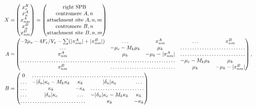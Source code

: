 \documentclass[a4paper,12pt]{article}
\begin{document}
\begin{equation}
  \begin{aligned}
    X = &%
    \begin{pmatrix}
      x_s^R\\
      x_n^A\\
      x_{nm}^A\\
      x_n^B\\
      x_{nm}^B\\
    \end{pmatrix} =%
    \begin{pmatrix}
      \text{right SPB}\\
      \text{centromere }A, n\\
      \text{attachment site }A, n,m\\
      \text{centromere }B, n\\
      \text{attachment site }B, n,m\\
    \end{pmatrix}\\
    A = &%
    \begin{pmatrix}
      - 2 \mu_s - 4 F_z/V_z - \sum (|\pi_{nm}^A| + |\pi_{nm}^B|)& \hdots & \pi_{nm}^A &%
      \hdots &  \pi_{nm}^B\\
      \hdots &  -\mu_c - M_k \mu_k& \mu_k & \hdotsfor{2}\\
      \pi_{nm}^A & \mu_k & - \mu_k - |\pi_{nm}^A| & \hdotsfor{2}\\
      \hdotsfor{3} & -\mu_c - M_k \mu_k & \mu_k\\
      \pi_{nm}^B & \hdotsfor{2} & \mu_k & - \mu_k - |\pi_{nm}^B| \\
    \end{pmatrix}, \\
    B = &%
    \begin{pmatrix}
      \,0\, & \hdotsfor{4}\\
      \hdots & - |\delta_n|\kappa_c - M_k \kappa_k & \kappa_k &%
      |\delta_n|\kappa_c & \hdots \\
      \hdots & \kappa_k & -\kappa_k &  \hdotsfor{2}\\
      \hdots & |\delta_n|\kappa_c & \hdots &%
      -|\delta_n|\kappa_c - M_k \kappa_k & \kappa_k \\
      \hdotsfor{3}  & \kappa_k & - \kappa_k\\
    \end{pmatrix}\\

\end{aligned}
\end{equation}
\end{document}
